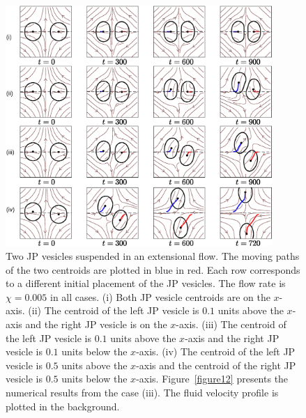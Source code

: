 \documentclass[lineno]{jfm}
\begin{document}
\begin{figure}
\begin{center}
\includegraphics[width=0.9\textwidth]{ExtTraj.eps}
\end{center} 
  \caption{\label{figure11} Two JP vesicles suspended in
  an extensional flow. The moving paths of the two centroids are plotted
  in blue in red. Each row corresponds to a different initial placement
  of the JP vesicles. The flow rate is $\chi = 0.005$ in all cases.
  (i) Both JP vesicle centroids are on the $x$-axis. (ii) The
  centroid of the left JP vesicle is $0.1$ units above the $x$-axis
  and the right JP vesicle is on the $x$-axis. (iii) The centroid of
  the left JP vesicle is $0.1$ units above the $x$-axis and the right
  JP vesicle is $0.1$ units below the $x$-axis. (iv) The centroid of
  the left JP vesicle is $0.5$ units above the $x$-axis and the
  centroid of the right JP vesicle is $0.5$ units below the $x$-axis.
  Figure~\ref{figure12} presents the numerical results from the case
  (iii).  The fluid velocity profile is plotted in the background.}
\end{figure}
\end{document}

